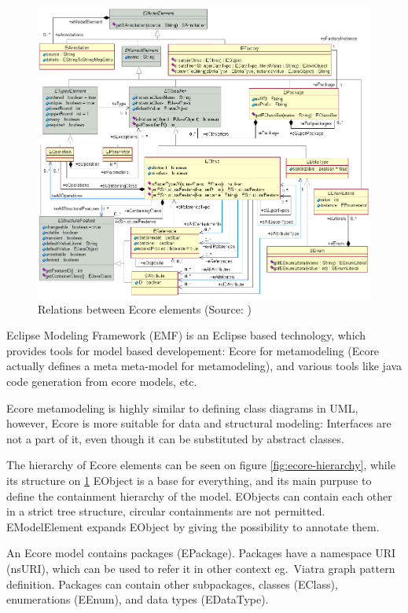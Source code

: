 \begin{figure}
	\begin{center}
		\includegraphics[width=\textwidth]{figures/EcoreRelations.png}
		\caption{Relations between Ecore elements (Source: \cite{ecore-package}) }
		\label{fig:ecore-relations}
	\end{center}
\end{figure}

Eclipse Modeling Framework (EMF) is an Eclipse based technology, which provides tools for model based developement: 
Ecore \cite{ecore-package} for metamodeling (Ecore actually defines a meta meta-model for metamodeling), and various tools like java code generation from ecore models, etc.

Ecore metamodeling is highly similar to defining class diagrams in UML, however, 
Ecore is more suitable for data and structural modeling: Interfaces are not a part of it, even though it can be substituted by abstract classes.

The hierarchy of Ecore elements can be seen on figure \ref{fig:ecore-hierarchy}, while its structure on \ref{fig:ecore-relations}
EObject is a base for everything, and its main purpuse to define the containment hierarchy of the model. 
EObjects can contain each other in a strict tree structure, circular containments are not permitted.
EModelElement expands EObject by giving the possibility to annotate them.

An Ecore model contains packages (EPackage). 
Packages have a namespace URI (nsURI), which can be used to refer it in other context eg.\ Viatra graph pattern definition.
Packages can contain other subpackages, classes (EClass), enumerations (EEnum), and data types (EDataType).

